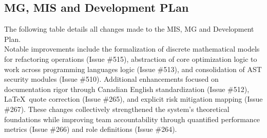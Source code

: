 \documentclass{article}
\begin{document}
\subsection{MG, MIS and Development PLan}

The following table details all changes made to the MIS, MG and Development Plan. \\

Notable improvements include the formalization of discrete mathematical models for %
refactoring operations (Issue \#515), abstraction of core optimization logic to work across programming languages %
logic (Issue \#513), and consolidation of AST security modules (Issue \#510). %
Additional enhancements focused on documentation rigor through Canadian English %
standardization (Issue \#512), \LaTeX\ quote correction (Issue \#265), and %
explicit risk mitigation mapping (Issue \#267). These changes collectively %
strengthened the system's theoretical foundations while improving team %
accountability through quantified performance metrics (Issue \#266) and %
role definitions (Issue \#264).
\end{document}
